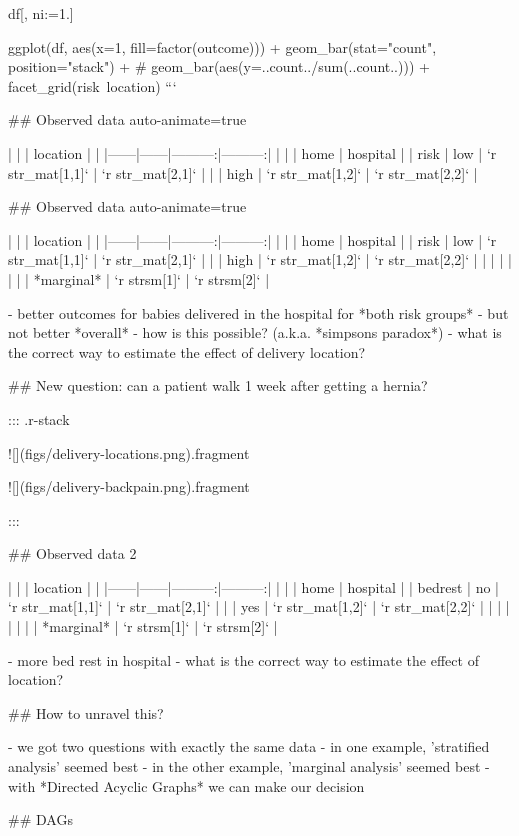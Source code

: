 df[, ni:=1.]

ggplot(df, aes(x=1, fill=factor(outcome))) +
  geom_bar(stat="count", position="stack") + 
  # geom_bar(aes(y=..count../sum(..count..))) + 
  facet_grid(risk~location)
```


## Observed data {auto-animate=true}

|      |      | location |          |
|------|------|---------:|---------:|
|      |      | home     | hospital |
| risk | low  | `r str_mat[1,1]` | `r str_mat[2,1]` |
|      | high | `r str_mat[1,2]` | `r str_mat[2,2]` |


## Observed data {auto-animate=true}

|      |      | location |          |
|------|------|---------:|---------:|
|      |      | home     | hospital |
| risk | low  | `r str_mat[1,1]` | `r str_mat[2,1]` |
|      | high | `r str_mat[1,2]` | `r str_mat[2,2]` |
|      |      |                  |                  |
|      | *marginal* | `r strsm[1]` | `r strsm[2]` |

- better outcomes for babies delivered in the hospital for *both risk groups*
- but not better *overall*
- how is this possible? (a.k.a. *simpsons paradox*)
- what is the correct way to estimate the effect of delivery location?

## New question: can a patient walk 1 week after getting a hernia?

::: {.r-stack}

![](figs/delivery-locations.png){.fragment}

![](figs/delivery-backpain.png){.fragment}

:::

## Observed data 2

|      |      | location |          |
|------|------|---------:|---------:|
|      |      | home     | hospital |
| bedrest | no | `r str_mat[1,1]` | `r str_mat[2,1]` |
|      | yes | `r str_mat[1,2]` | `r str_mat[2,2]` |
|      |      |                  |                  |
|      | *marginal* | `r strsm[1]` | `r strsm[2]` |

- more bed rest in hospital
- what is the correct way to estimate the effect of location?

## How to unravel this?

- we got two questions with exactly the same data
- in one example, 'stratified analysis' seemed best
- in the other example, 'marginal analysis' seemed best
- with *Directed Acyclic Graphs* we can make our decision

## DAGs

